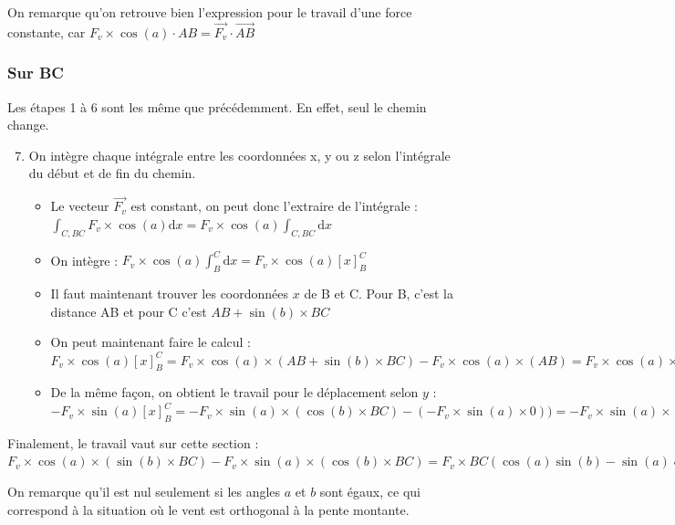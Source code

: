 \documentclass[french]{yLectureNote}
\renewcommand{\vec}{\overrightarrow}
\newcommand{\dd}[0]{\mathrm{d}}
\begin{document}
On remarque qu'on retrouve bien l'expression pour le travail d'une force constante, car $F_v\times\cos(a)\cdot AB = \vec{F_v}\cdot \vec{AB}$
\subsubsection{Sur BC}
Les étapes 1 à 6 sont les m\^eme que précédemment. En effet, seul le chemin change.
\begin{enumerate}
\setcounter{enumi}{6}
  \item On intègre chaque intégrale entre les coordonnées x, y ou z selon l'intégrale du début et de fin du chemin.
  \begin{itemize}
   \item Le vecteur $\vec{F_v}$ est constant, on peut donc l'extraire de l'intégrale : $\int_{C,BC}F_v\times\cos(a) \dd x = F_v\times\cos(a)\int_{C,BC} \dd x$
   \item On intègre : $ F_v\times\cos(a)\int_{B}^C \dd x = F_v\times\cos(a)[x]_{B}^C$
   \item Il faut maintenant trouver les coordonnées $x$ de B et C. Pour B, c'est la distance AB et pour C c'est $AB + \sin(b)\times BC$
   \item On peut maintenant faire le calcul : $F_v\times\cos(a)[x]_{B}^C = F_v\times\cos(a)\times(AB + \sin(b)\times BC) - F_v\times\cos(a)\times(AB) = F_v\times\cos(a)\times(\sin(b)\times BC)$
   \item De la m\^eme façon, on obtient le travail pour le déplacement selon $y$ : $-F_v\times\sin(a)[x]_{B}^C = -F_v\times\sin(a)\times(\cos(b)\times BC) - (-F_v\times\sin(a)\times 0)) = -F_v\times\sin(a)\times(\cos(b)\times BC)$
  \end{itemize}
\end{enumerate}
Finalement, le travail vaut sur cette section : $F_v\times\cos(a)\times(\sin(b)\times BC) -F_v\times\sin(a)\times(\cos(b)\times BC) = F_v\times BC(\cos(a)\sin(b)-\sin(a)\cos(b))$

On remarque qu'il est nul seulement si les angles $a$ et $b$ sont égaux, ce qui correspond à la situation où le vent est orthogonal à la pente montante.
\end{document}
